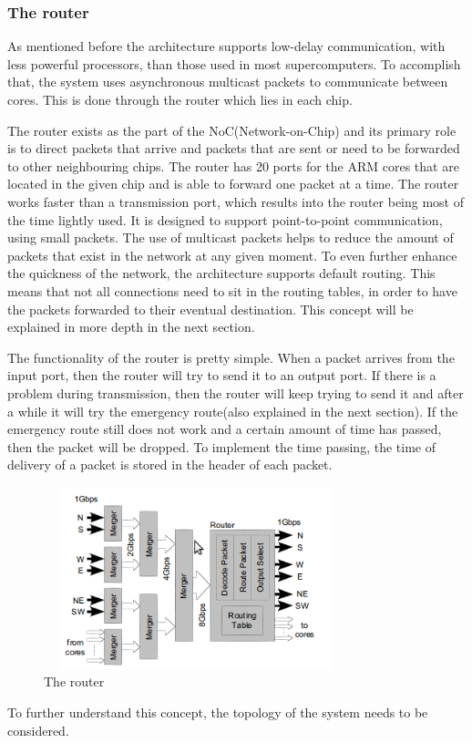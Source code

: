 \documentclass[12pt,a4paper]{article}
\begin{document}
\subsubsection{The router}
As mentioned before the architecture supports low-delay communication, with less powerful processors, than those used in most supercomputers. To accomplish that, the system uses asynchronous multicast packets to communicate between cores. This is done through the router which lies in each chip.

The router exists as the part of the NoC(Network-on-Chip) and its primary role is to direct packets that arrive and packets that are sent or need to be forwarded to other neighbouring chips. The router has 20 ports for the ARM cores that are located in the given chip and is able to forward one packet at a time. The router works faster than a transmission port, which results into the router being most of the time lightly used. It is designed to support point-to-point communication, using small packets. The use of multicast packets helps to reduce the amount of packets that exist in the network at any given moment. To even further enhance the quickness of the network, the architecture supports default routing. This means that not all connections need to sit in the routing tables, in order to have the packets forwarded to their eventual destination. This concept will be explained in more depth in the next section.

The functionality of the router is pretty simple. When a packet arrives from the input port, then the router will try to send it to an output port. If there is a problem during transmission, then the router will keep trying to send it and after a while it will try the emergency route(also explained in the next section). If the emergency route still does not work and a certain amount of time has passed, then the packet will be dropped. To implement the time passing, the time of delivery of a packet is stored in the header of each packet.

\begin{figure}[h!]
\includegraphics[width=250pt,height=150pt,scale=2]{Pics/router.png}
\centering
\caption{The router\cite{navaridas2009understanding}}
\end{figure}
To further understand this concept, the topology of the system needs to be considered.
\end{document}
